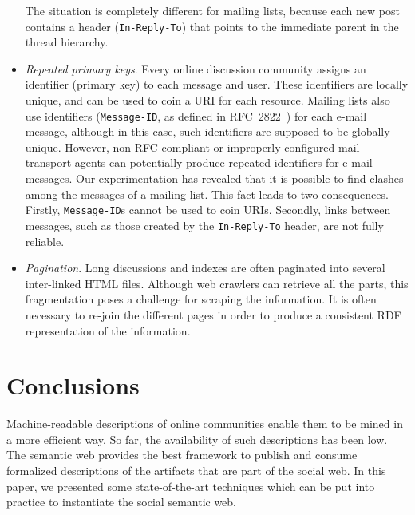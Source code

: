 \documentclass{../templates/www2008-submission}
\begin{document}
\begin{itemize}
        The situation is completely different for mailing lists, because
        each new post contains a header (\texttt{In-Reply-To}) that points
        to the immediate parent in the thread hierarchy.

  \item \emph{Repeated primary keys}. Every online discussion community assigns
        an identifier (primary key) to each message and user. These
        identifiers are locally unique, and can be used to coin a URI
        for each resource. Mailing lists also use identifiers
        (\texttt{Message-ID}, as defined in RFC~2822~\cite{RFC2822}) for
        each e-mail message, although in this case, such identifiers are
        supposed to be globally-unique. However, non RFC-compliant or
        improperly configured mail transport agents can potentially produce repeated
        identifiers for e-mail messages. Our experimentation has
        revealed that it is possible to find clashes among the messages
        of a mailing list. This fact leads to two consequences. Firstly,
        \texttt{Message-ID}s cannot be used to coin URIs. Secondly,
        links between messages, such as those created by the
        \texttt{In-Reply-To} header, are not fully reliable.

  \item \emph{Pagination}. Long discussions and indexes are often paginated
        into several inter-linked HTML files. Although web crawlers can
        retrieve all the parts, this fragmentation poses a challenge for
        scraping the information. It is often necessary to re-join the
        different pages in order to produce a consistent RDF representation
        of the information.

\end{itemize}


\section{Conclusions}\label{sec:conclusions}

Machine-readable descriptions of online communities enable them
to be mined in a more efficient way. So far, the availability of
such descriptions has been low. The semantic web provides the
best framework to publish and consume formalized descriptions of
the artifacts that are part of the social web. In this paper,
we presented some state-of-the-art techniques which can be
put into practice to instantiate the social semantic web.
\end{document}
